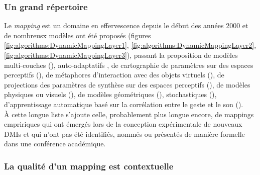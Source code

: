 \subsubsection{Un grand répertoire}

\noindent Le \textit{mapping} est un domaine en effervescence depuis le début des années 2000 et de nombreusx modèles ont été proposés (figures \ref{fig:algorithms:DynamicMappingLayer1}, \ref{fig:algorithms:DynamicMappingLayer2}, \ref{fig:algorithms:DynamicMappingLayer3}), passant la proposition de modèles multi-couches (\cite{wanderley_escher-modeling_1998, hunt_mapping_2002}), auto-adaptatifs \cite{verfaille_mapping_2006}, de cartographie de paramètres sur des espaces perceptifs (\cite{wessel_timbre_1979, schwarz_sound_2012, tubb_divergent_2014}), de métaphores d'interaction avec des objets virtuels (\cite{wessel_intimate_2002}), de projections des paramètres de synthèse sur des espaces perceptifs (\cite{wyse_instrumentalizing_2010}), de modèles physiques ou visuels (\cite{momeni_dynamic_2006}), de modèles géométriques (\cite{van_nort_choice_2004}), stochastiques (\cite{dabby_musical_1996}), d'apprentissage automatique basé sur la corrélation entre le geste et le son (\cite{fiebrink_real-time_2011, caramiaux_mapping_2014, francoise_motion-sound_2015}).\\
\indent À cette longue liste s'ajoute celle, probablement plus longue encore, de mappings empririques qui ont émergés lors de la conception expérimentale de nouveaux \glspl{DMI} et qui n'ont pas été identifiés, nommés ou présentés de manière formelle dans une conférence académique.

\subsubsection{La qualité d'un mapping est contextuelle}

